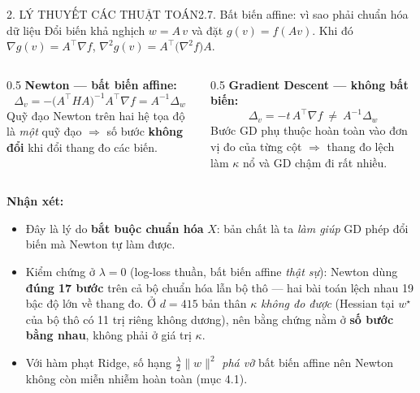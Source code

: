 \documentclass[aspectratio=169,11pt]{beamer}
\newcommand{\nx}{\textbf{Nhận xét:}}
\newcommand{\wstar}{w^{\star}}
\newcommand{\norm}[1]{\lVert #1 \rVert}
\begin{document}
\begin{frame}{2. LÝ THUYẾT CÁC THUẬT TOÁN}{2.7. Bất biến affine: vì sao phải chuẩn hóa dữ liệu}
  \small
  Đổi biến khả nghịch $w=A\,v$ và đặt $g(v)=f(Av)$. Khi đó
  $\nabla g(v)=A^\top\nabla f$, $\nabla^2 g(v)=A^\top\big(\nabla^2 f\big)A$.
  \begin{columns}[T]
    \begin{column}{0.5\textwidth}
      \textbf{Newton — bất biến affine:}
      \[
        \Delta_v=-\big(A^\top H A\big)^{-1}A^\top\nabla f=A^{-1}\Delta_w
      \]
      Quỹ đạo Newton trên hai hệ tọa độ là \emph{một} quỹ đạo
      $\Rightarrow$ số bước \textbf{không đổi} khi đổi thang đo các biến.
    \end{column}
    \begin{column}{0.5\textwidth}
      \textbf{Gradient Descent — không bất biến:}
      \[
        \Delta_v=-t\,A^\top\nabla f\ \ne\ A^{-1}\Delta_w
      \]
      Bước GD phụ thuộc hoàn toàn vào đơn vị đo của từng cột
      $\Rightarrow$ thang đo lệch làm $\kappa$ nổ và GD chậm đi rất nhiều.
    \end{column}
  \end{columns}
  \vspace{6pt}
  {\footnotesize\nx{}}
  \begin{itemize}\scriptsize
    \item Đây là lý do \textbf{bắt buộc chuẩn hóa} $X$: bản chất là ta \emph{làm giúp} GD phép đổi
          biến mà Newton tự làm được.
    \item Kiểm chứng ở $\lambda=0$ (log-loss thuần, bất biến affine \emph{thật sự}): Newton dùng
          \textbf{đúng 17 bước} trên cả bộ chuẩn hóa lẫn bộ thô --- hai bài toán lệch nhau 19 bậc
          độ lớn về thang đo. Ở $d=415$ bản thân $\kappa$ \emph{không đo được} (Hessian tại $\wstar$
          của bộ thô có 11 trị riêng không dương), nên bằng chứng nằm ở \textbf{số bước bằng nhau},
          không phải ở giá trị $\kappa$.
    \item Với hàm phạt Ridge, số hạng $\tfrac\lambda2\norm{w}^2$ \emph{phá vỡ} bất biến affine
          nên Newton không còn miễn nhiễm hoàn toàn (mục 4.1).
  \end{itemize}
\end{frame}
\end{document}
